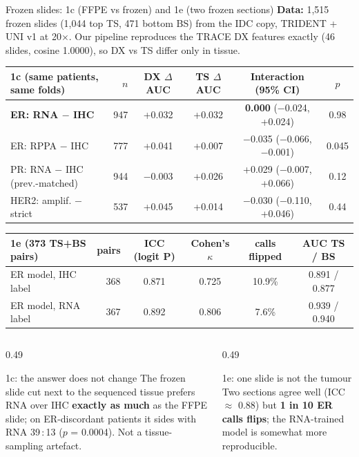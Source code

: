 \documentclass[aspectratio=169,10pt]{beamer}
\begin{document}
\begin{frame}[t]{Frozen slides: 1c (FFPE vs frozen) and 1e (two frozen sections)}
\footnotesize
\textbf{Data:} 1,515 frozen slides (1,044 top TS, 471 bottom BS) from the IDC copy, TRIDENT + UNI v1 at 20$\times$.
Our pipeline reproduces the TRACE DX features exactly (46 slides, cosine 1.0000), so DX vs TS differ only in tissue.
\vspace{3pt}

\centering
\scriptsize
\begin{tabular}{lrcccc}
\toprule
\textbf{1c} (same patients, same folds) & $n$ & DX $\Delta$AUC & TS $\Delta$AUC & Interaction (95\% CI) & $p$ \\
\midrule
\textbf{ER: RNA $-$ IHC} & 947 & +0.032 & +0.032 & \textbf{0.000} ($-$0.024, +0.024) & 0.98 \\
ER: RPPA $-$ IHC & 777 & +0.041 & +0.007 & $-$0.035 ($-$0.066, $-$0.001) & 0.045 \\
PR: RNA $-$ IHC (prev.-matched) & 944 & $-$0.003 & +0.026 & +0.029 ($-$0.007, +0.066) & 0.12 \\
HER2: amplif. $-$ strict & 537 & +0.045 & +0.014 & $-$0.030 ($-$0.110, +0.046) & 0.44 \\
\bottomrule
\end{tabular}

\vspace{4pt}
\begin{tabular}{lrcccc}
\toprule
\textbf{1e} (373 TS+BS pairs) & pairs & ICC (logit P) & Cohen's $\kappa$ & calls flipped & AUC TS / BS \\
\midrule
ER model, IHC label & 368 & 0.871 & 0.725 & 10.9\% & 0.891 / 0.877 \\
ER model, RNA label & 367 & 0.892 & 0.806 & 7.6\% & 0.939 / 0.940 \\
\bottomrule
\end{tabular}

\vspace{4pt}
\raggedright
\begin{columns}[T]
\begin{column}{0.49\textwidth}
\begin{block}{1c: the answer does not change}
The frozen slide cut next to the sequenced tissue prefers RNA over IHC \textbf{exactly as much} as the FFPE slide;
on ER-discordant patients it sides with RNA 39\,:\,13 ($p$ = 0.0004). Not a tissue-sampling artefact.
\end{block}
\end{column}
\begin{column}{0.49\textwidth}
\begin{alertblock}{1e: one slide is not the tumour}
Two sections agree well (ICC $\approx$ 0.88) but \textbf{1 in 10 ER calls flips}; the RNA-trained model is somewhat
more reproducible.
\end{alertblock}
\end{column}
\end{columns}
\end{frame}
\end{document}
